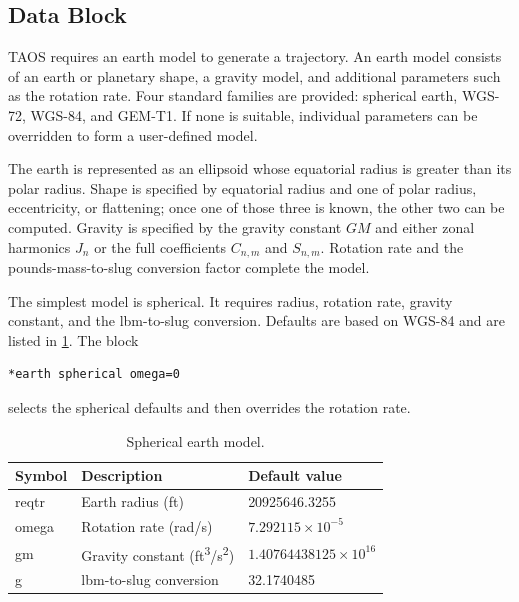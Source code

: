 \subsection{ Data Block}\label{sec:block-earth}

TAOS requires an earth model to generate a trajectory. An earth model consists of
an earth or planetary shape, a gravity model, and additional parameters such as the
rotation rate. Four standard families are provided: spherical earth, WGS-72,
WGS-84, and GEM-T1. If none is suitable, individual parameters can be overridden
to form a user-defined model.

The earth is represented as an ellipsoid whose equatorial radius is greater than its
polar radius. Shape is specified by equatorial radius and one of polar radius,
eccentricity, or flattening; once one of those three is known, the other two can be
computed. Gravity is specified by the gravity constant $GM$ and either zonal
harmonics $J_n$ or the full coefficients $C_{n,m}$ and $S_{n,m}$. Rotation rate
and the pounds-mass-to-slug conversion factor complete the model.


The simplest model is spherical. It requires radius, rotation rate, gravity constant,
and the lbm-to-slug conversion. Defaults are based on WGS-84 and are listed in
\cref{tab:spherical-earth-model}. The block

\begin{lstlisting}[style=taosmanual]
*earth spherical omega=0
\end{lstlisting}

selects the spherical defaults and then overrides the rotation rate.

\begin{table}[htbp]
  \centering
  \caption{Spherical earth model.}
  \label{tab:spherical-earth-model}
  \begin{tabularx}{0.76\linewidth}{@{}>{\ttfamily}lXl@{}}
    \toprule
    \normalfont Symbol & Description & Default value \\
    \midrule
    reqtr & Earth radius (ft) & 20925646.3255 \\
    omega & Rotation rate (rad/s) & $7.292115\times10^{-5}$ \\
    gm    & Gravity constant (ft\textsuperscript{3}/s\textsuperscript{2}) & $1.40764438125\times10^{16}$ \\
    g     & lbm-to-slug conversion & 32.1740485 \\
    \bottomrule
  \end{tabularx}
\end{table}

